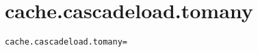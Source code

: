 \section{cache.cascadeload.tomany}
\label{configuration:CacheCascadeloadTomany}
\AvailableInCsharpOnly{\TODO}
\begin{lstlisting}[style=Props,caption={Usage example for \textit{cache.cascadeload.tomany}}]
cache.cascadeload.tomany=
\end{lstlisting}